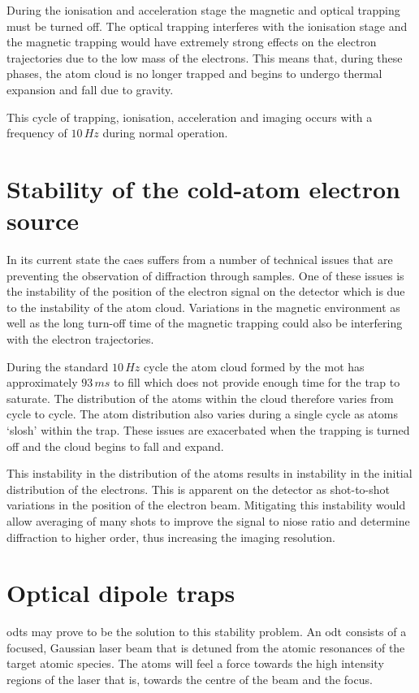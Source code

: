 During the ionisation and acceleration stage the magnetic and optical trapping must be turned off. The optical trapping interferes with the ionisation stage and the magnetic trapping would have extremely strong effects on the electron trajectories due to the low mass of the electrons. This means that, during these phases, the atom cloud is no longer trapped and begins to undergo thermal expansion and fall due to gravity.

This cycle of trapping, ionisation, acceleration and imaging occurs with a frequency of $10\,\unit{Hz}$ during normal operation.

\section{Stability of the cold-atom electron source}

In its current state the \gls{caes} suffers from a number of technical issues that are preventing the observation of diffraction through samples. One of these issues is the instability of the position of the electron signal on the detector which is due to the instability of the atom cloud. Variations in the magnetic environment as well as the long turn-off time of the magnetic trapping could also be interfering with the electron trajectories.

During the standard $10\,\unit{Hz}$ cycle the atom cloud formed by the \gls{mot} has approximately $93\,\unit{ms}$ to fill which does not provide enough time for the trap to saturate. The distribution of the atoms within the cloud therefore varies from cycle to cycle. The atom distribution also varies during a single cycle as atoms `slosh' within the trap. These issues are exacerbated when the trapping is turned off and the cloud begins to fall and expand.

This instability in the distribution of the atoms results in instability in the initial distribution of the electrons. This is apparent on the detector as shot-to-shot variations in the position of the electron beam. Mitigating this instability would allow averaging of many shots to improve the signal to niose ratio and determine diffraction to higher order, thus increasing the imaging resolution.

\section{Optical dipole traps}

\Glspl{odt} may prove to be the solution to this stability problem. An \gls{odt} consists of a focused, Gaussian laser beam that is detuned from the atomic resonances of the target atomic species. The atoms will feel a force towards the high intensity regions of the laser that is, towards the centre of the beam and the focus.

